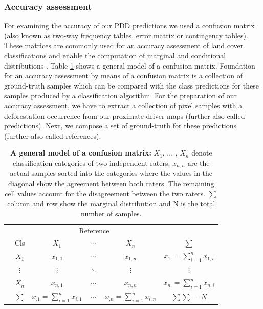 		\subsubsection{Accuracy assessment}
		For examining the accuracy of our \ac{PDD} predictions we used a confusion matrix (also known as two-way frequency tables, error matrix or contingency tables). These matrices are commonly used for an accuracy assessment of land cover classifications and enable the computation of marginal and conditional distributions \citep{Congalton1991,Foody2002}. Table \ref{tab:confusion_matrix} shows a general model of a confusion matrix. Foundation for an accuracy assessment by means of a confusion matrix is a collection of ground-truth samples which can be compared with the class predictions for these samples produced by a classification algorithm. For the preparation of our accuracy assessment, we have to extract a collection of pixel samples with a deforestation occurrence from our proximate driver maps (further also called predictions). Next, we compose a set of ground-truth for these predictions (further also called references).
			\begin{table}[ht]
				\centering
				\caption[A general model of a confusion matrix]{\textbf{A general model of a confusion matrix:} $X_1$, ... , $X_n$ denote classification categories of two independent raters. $x_{n,n}$ are the actual samples sorted into the categories where the values in the diagonal show the agreement between both raters. The remaining cell values account for the disagreement between the two raters. $\sum$ column and row show the marginal distribution and N is the total number of samples.}
				\label{tab:confusion_matrix}
				\begin{tabular}{lccccc}
					\hline
					& & \multicolumn{3}{c}{Reference} & \\
					& Cls & $X_1$ & $\cdots$ & $X_n$ & $\sum$ \\\hline
					\multirow{4}{*}{\STAB{\rotatebox[origin=c]{90}{Predict}}}
					& $X_1$ & $x_{1,1}$ & $\cdots$ & $x_{1,n}$ & $x_{1.}=
					\displaystyle\sum_{i=1}^{n} x_{1,i}$ \\ 
					& $\vdots$ & $\vdots$ & $\ddots$ & $\vdots$ & $\vdots$ \\ 
					& $X_n$ & $x_{n,1}$ & $\cdots$ & $x_{n,n}$ & $x_{n.}=\displaystyle\sum_{i=1}^{n}x_{n,i}$ \\\hline 
					& $\sum$ & $x_{.1}=\displaystyle\sum_{i=1}^{n}x_{i,1}$ & $\cdots$ & $x_{.n}=\displaystyle\sum_{i=1}^{n}x_{i,n}$ & $\sum\sum=N$ \\\hline
				\end{tabular}
			\end{table}

